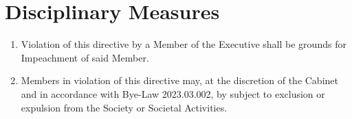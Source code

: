 \documentclass{scrartcl}
\begin{document}
    \clearpage
    \section{Disciplinary Measures}
        \label{disciplinary-measures}
        \begin{enumerate}
            \item Violation of this directive by a Member of the Executive shall be grounds for Impeachment of said Member.
            \item Members in violation of this directive may, at the discretion of the Cabinet and in accordance with Bye-Law 2023.03.002, by subject to exclusion or expulsion from the Society or Societal Activities.
        \end{enumerate}
\end{document}
